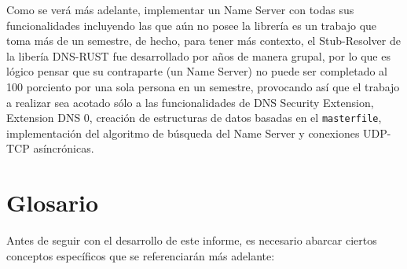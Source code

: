 Como se verá más adelante, implementar un Name Server con todas sus funcionalidades incluyendo las que aún no posee la librería es un trabajo 
que toma más de un semestre, de hecho, para tener más contexto, el Stub-Resolver de la libería DNS-RUST fue desarrollado por años de manera 
grupal, por lo que es lógico pensar que su contraparte (un Name Server) no puede ser completado al 100 porciento por una sola persona en un 
semestre, provocando así que el trabajo a realizar sea acotado sólo a las funcionalidades de DNS Security Extension, Extension DNS 0, 
creación de estructuras de datos basadas en el \texttt{masterfile}, implementación del algoritmo de búsqueda del Name Server y conexiones UDP-TCP 
asíncrónicas.



\section{Glosario}
Antes de seguir con el desarrollo de este informe, es necesario abarcar ciertos conceptos específicos que se referenciarán más adelante:

